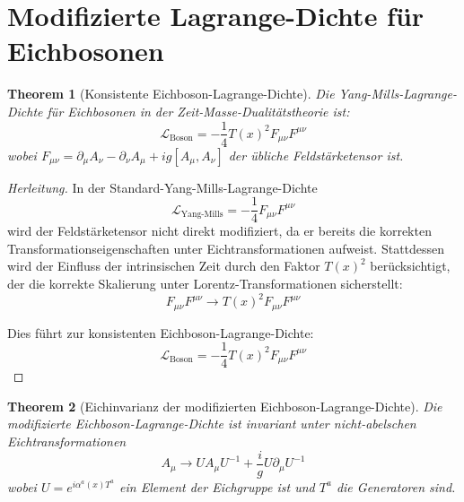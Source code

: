 \documentclass{article}
\newtheorem{theorem}{Theorem}[section]
\theoremstyle{definition}
\theoremstyle{remark}
\newcommand{\Tfield}{T(x)} %
\begin{document}
		\section{Modifizierte Lagrange-Dichte für Eichbosonen}
		
		\begin{theorem}[Konsistente Eichboson-Lagrange-Dichte]
			Die Yang-Mills-Lagrange-Dichte für Eichbosonen in der Zeit-Masse-Dualitätstheorie ist:
			\begin{equation}
				\mathcal{L}_{\text{Boson}} = -\frac{1}{4} \Tfield^2 F_{\mu\nu}F^{\mu\nu}
			\end{equation}
			wobei $F_{\mu\nu} = \partial_\mu A_\nu - \partial_\nu A_\mu + ig[A_\mu, A_\nu]$ der übliche Feldstärketensor ist.
		\end{theorem}
		
		\begin{proof}[Herleitung]
			In der Standard-Yang-Mills-Lagrange-Dichte
			\begin{equation}
				\mathcal{L}_{\text{Yang-Mills}} = -\frac{1}{4}F_{\mu\nu}F^{\mu\nu}
			\end{equation}
			wird der Feldstärketensor nicht direkt modifiziert, da er bereits die korrekten Transformationseigenschaften unter Eichtransformationen aufweist. Stattdessen wird der Einfluss der intrinsischen Zeit durch den Faktor $\Tfield^2$ berücksichtigt, der die korrekte Skalierung unter Lorentz-Transformationen sicherstellt:
			\begin{equation}
				F_{\mu\nu}F^{\mu\nu} \rightarrow \Tfield^2 F_{\mu\nu}F^{\mu\nu}
			\end{equation}
			
			Dies führt zur konsistenten Eichboson-Lagrange-Dichte:
			\begin{equation}
				\mathcal{L}_{\text{Boson}} = -\frac{1}{4} \Tfield^2 F_{\mu\nu}F^{\mu\nu}
			\end{equation}
		\end{proof}
		
		\begin{theorem}[Eichinvarianz der modifizierten Eichboson-Lagrange-Dichte]
			Die modifizierte Eichboson-Lagrange-Dichte ist invariant unter nicht-abelschen Eichtransformationen
			\begin{equation}
				A_\mu \rightarrow U A_\mu U^{-1} + \frac{i}{g}U\partial_\mu U^{-1}
			\end{equation}
			wobei $U = e^{i\alpha^a(x)T^a}$ ein Element der Eichgruppe ist und $T^a$ die Generatoren sind.
		\end{theorem}
		
\end{document}

